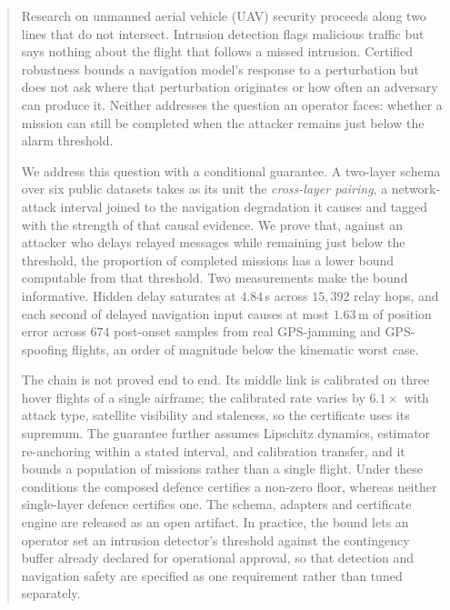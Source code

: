 \begin{abstract}
Research on unmanned aerial vehicle (UAV) security proceeds along two lines that
do not intersect. Intrusion detection flags malicious traffic but says nothing
about the flight that follows a missed intrusion. Certified robustness bounds a
navigation model's response to a perturbation but does not ask where that
perturbation originates or how often an adversary can produce it. Neither
addresses the question an operator faces: whether a mission can still be
completed when the attacker remains just below the alarm threshold.

We address this question with a conditional guarantee. A two-layer schema over
six public datasets takes as its unit the \emph{cross-layer pairing}, a
network-attack interval joined to the navigation degradation it causes and
tagged with the strength of that causal evidence. We prove that, against an
attacker who delays relayed messages while remaining just below the threshold,
the proportion of completed missions has a lower bound computable from that
threshold. Two measurements make the bound informative. Hidden delay saturates
at $4.84$\,s across $15{,}392$ relay hops, and each second of delayed navigation
input causes at most $1.63$\,m of position error across $674$ post-onset samples
from real GPS-jamming and GPS-spoofing flights, an order of magnitude below the
kinematic worst case.

The chain is not proved end to end. Its middle link is calibrated on three hover
flights of a single airframe; the calibrated rate varies by $6.1\times$ with
attack type, satellite visibility and staleness, so the certificate uses its
supremum. The guarantee further assumes Lipschitz dynamics, estimator
re-anchoring within a stated interval, and calibration transfer, and it bounds a
population of missions rather than a single flight. Under these conditions the
composed defence certifies a non-zero floor, whereas neither single-layer
defence certifies one. The schema, adapters and certificate engine are released
as an open artifact. In practice, the bound lets an operator set an intrusion
detector's threshold against the contingency buffer already declared for
operational approval, so that detection and navigation safety are specified as
one requirement rather than tuned separately.
\end{abstract}

